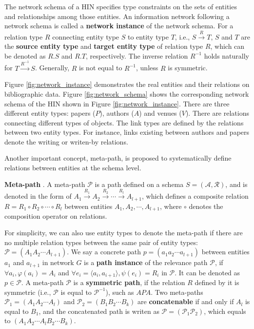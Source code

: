 \documentclass{acm_proc_article-csis8101}
\begin{document}
The network schema of a HIN specifies type constraints on the sets of entities and relationships among those entities. An information network following a network schema is called a {\bf network instance} of the network schema. For a relation type $R$ connecting entity type $S$ to entity type $T$, i.e., $S\xrightarrow{R} T$, $S$ and $T$ are the {\bf source entity type} and {\bf target entity type} of relation type $R$, which can be denoted as $R.S$ and $R.T$, respectively. The inverse relation $R^{-1}$ holds naturally for $T \xrightarrow{R^{-1}} S$. Generally, $R$ is not equal to $R^{-1}$, unless $R$ is symmetric.

\begin{example}
Figure \ref{fig:network_instance} demonstrates the real entities and their relations on bibliographic data. Figure \ref{fig:network_schema} shows the corresponding network schema of the HIN shown in Figure \ref{fig:network_instance}. There are three different entity types: papers ($P$), authors ($A$) and venues ($V$). There are relations connecting different types of objects. The link types are defined by the relations between two entity types. For instance, links existing between authors and papers denote the writing or writen-by relations.
\end{example}

Another important concept, meta-path, is proposed to systematically define relations between entities at the schema level.

\begin{definition}
{\bf Meta-path} \cite{sun2011pathsim}. A meta-path $\mathcal{P}$ is a path defined on a schema $S=(\mathcal{A}, \mathcal{R})$, and is denoted in the form of $A_{1}\xrightarrow{R_{1}}A_{2}\xrightarrow{R_{2}}\cdots \xrightarrow{R_{l}}A_{l+1}$, which defines a composite relation $R=R_{1}\circ R_{2}\circ \cdots \circ R_{l}$ between entities $A_{1}, A_{2}, \cdots, A_{l+1}$, where $\circ$ denotes the composition operator on relations.
\end{definition}

For simplicity, we can also use entity types to denote the meta-path if there are no multiple relation types between the same pair of entity types: $\mathcal{P}=(A_{1}A_{2}\cdots A_{l+1})$. We say a concrete path $p=(a_{1}a_{2}\cdots a_{l+1})$ between entities $a_{1}$ and $a_{l+1}$ in network $G$ is a {\bf path instance} of the relevance path $\mathcal{P}$, if $\forall a_{i}, \varphi(a_{i})=A_{i}$ and $\forall e_{i}= \langle a_{i}, a_{i+1} \rangle, \psi(e_{i})=R_{i}$ in $\mathcal{P}$. It can be denoted as $p \in \mathcal{P}$. A meta-path $\mathcal{P}$ is a {\bf symmetric path}, if the relation $R$ defined by it is symmetric (i.e., $\mathcal{P}$ is equal to $\mathcal{P}^{-1}$), such as $APA$. Two meta-paths $\mathcal{P}_{1}=(A_{1}A_{2}\cdots A_{l})$ and $\mathcal{P}_{2}=(B_{1}B_{2}\cdots B_{k})$ are {\bf concatenable} if and only if $A_{l}$ is equal to $B_{1}$, and the concatenated path is writen as $\mathcal{P}=(\mathcal{P}_{1}\mathcal{P}_{2})$, which equals to $(A_{1}A_{2}\cdots A_{l}B_{2}\cdots B_{k})$.
\end{document}
